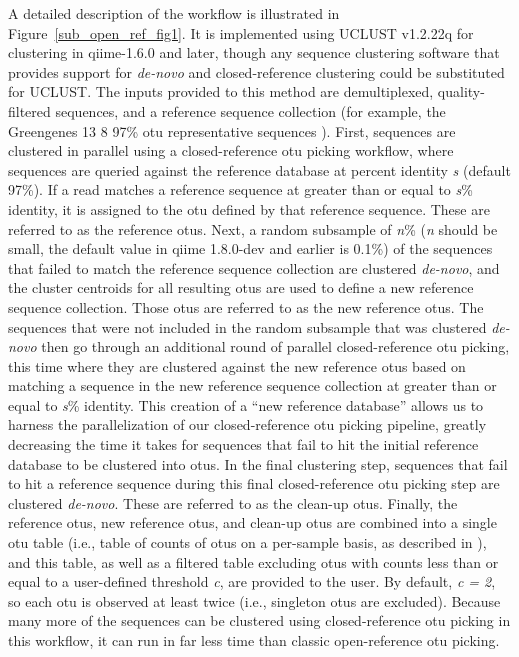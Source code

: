 A detailed description of the workflow is illustrated in Figure~\ref{sub_open_ref_fig1}.
It is implemented using UCLUST v1.2.22q \cite{Edgar2010} for clustering in \gls{qiime}-1.6.0 \cite{Caporaso2010}
and later, though any sequence clustering software that provides support for \emph{de-novo}
and closed-reference clustering could be substituted for UCLUST. The inputs
provided to this method are demultiplexed,
quality-filtered sequences, and a reference sequence collection (for example,
the Greengenes 13 8 97\% \gls{otu} representative sequences \cite{DeSantis2006, McDonald2012}).
First, sequences are clustered in parallel using a closed-reference \gls{otu} picking
workflow, where sequences are queried against the reference database at percent
identity \emph{s} (default 97\%). If a read matches a reference sequence at greater
than or equal to \emph{s}\% identity, it is assigned to the \gls{otu} defined by that
reference sequence. These are referred to as the reference \gls{otu}s. Next, a
random subsample of \emph{n}\% (\emph{n} should be small, the default value in
\gls{qiime} 1.8.0-dev and earlier is 0.1\%) of the sequences that failed to match
the reference sequence collection are clustered \emph{de-novo}, and the cluster
centroids for all resulting \gls{otu}s are used to define a new reference sequence
collection. Those \gls{otu}s are referred to as the new reference \gls{otu}s.
The sequences that were not included in the random subsample that was clustered
\emph{de-novo} then go through an additional round of parallel closed-reference \gls{otu}
picking, this time where they are clustered against the new reference \gls{otu}s based
on matching a sequence in the new reference sequence collection at greater than
or equal to \emph{s}\% identity. This creation of a “new reference database”
allows us to harness the parallelization of our closed-reference \gls{otu} picking
pipeline, greatly decreasing the time it takes for sequences that fail to hit the
initial reference database to be clustered into \gls{otu}s. In the final clustering
step, sequences that fail to hit a reference sequence during this final
closed-reference \gls{otu} picking step are clustered \emph{de-novo}. These are
referred to as the clean-up \gls{otu}s. Finally, the reference \gls{otu}s, new
reference \gls{otu}s, and clean-up \gls{otu}s are combined into a single \gls{otu}
table (i.e., table of counts of \gls{otu}s on a per-sample basis, as described in
\cite{McDonald2012BIOM}), and this table, as well as a filtered table excluding
\gls{otu}s with counts less than or equal to a user-defined threshold \emph{c},
are provided to the user. By default, \emph{c = 2}, so each \gls{otu} is
observed at least twice (i.e., singleton \gls{otu}s are excluded). Because
many more of the sequences can be clustered using closed-reference \gls{otu}
picking in this workflow, it can run in far less time than classic
open-reference \gls{otu} picking.


